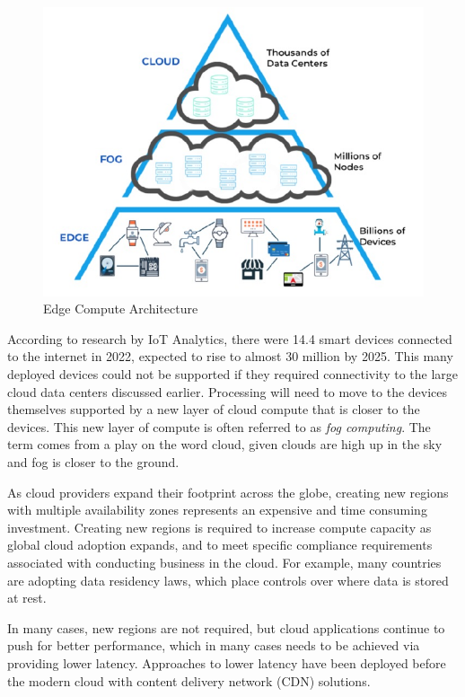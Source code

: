 \documentclass[conference]{IEEEconf}
\begin{document}
\begin{figure}
	\includegraphics[width=\columnwidth]{images/EdgeArchitecture}	
	\caption{Edge Compute Architecture}
	\label{fig:EdgeArchitecture}
\end{figure}


According to research by IoT Analytics, there were 14.4 smart devices connected to the internet in 2022, expected to rise to almost 30 million by 2025\cite{IoTMarket}.  This many deployed devices could not be supported if they required connectivity to the large cloud data centers discussed earlier. Processing will need to move to the devices themselves supported by a new layer of cloud compute that is closer to the devices.  This new layer of compute is often referred to as \textit{fog computing}.  The term comes from a play on the word cloud, given clouds are high up in the sky and fog is closer to the ground.   


As cloud providers expand their footprint across the globe, creating new regions with multiple availability zones represents an expensive and time consuming investment. Creating new regions is required to increase compute capacity as global cloud adoption expands, and to meet specific compliance requirements associated with conducting business in the cloud. For example, many countries are adopting data residency laws, which place controls over where data is stored at rest. 

In many cases, new regions are not required, but cloud applications continue to push for better performance, which in many cases needs to be achieved via providing lower latency.  Approaches to lower latency have been deployed before the modern cloud with content delivery network (CDN)\cite{CDN} solutions.
\end{document}
